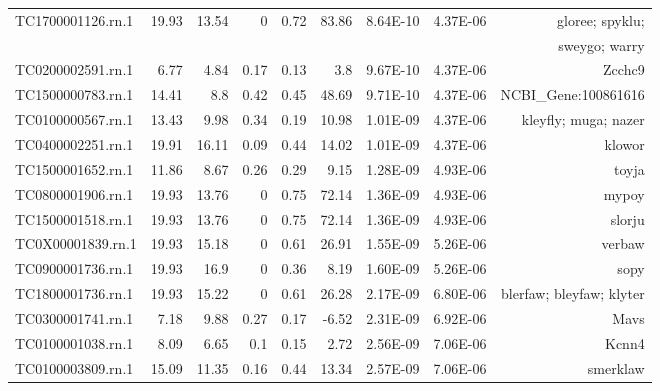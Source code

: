 \begin{sidewaystable}[]
\begin{tabular}{lrrrrrrrr}
TC1700001126.rn.1 & 19.93          & 13.54          & 0      & 0.72   & 83.86       & 8.64E-10 & 4.37E-06  & gloree; spyklu; \\
&           &           &      &    &        &  &   & sweygo; warry \\
TC0200002591.rn.1 & 6.77           & 4.84           & 0.17   & 0.13   & 3.8         & 9.67E-10 & 4.37E-06  & Zcchc9                        \\
TC1500000783.rn.1 & 14.41          & 8.8            & 0.42   & 0.45   & 48.69       & 9.71E-10 & 4.37E-06  & NCBI\_Gene:100861616          \\
TC0100000567.rn.1 & 13.43          & 9.98           & 0.34   & 0.19   & 10.98       & 1.01E-09 & 4.37E-06  & kleyfly; muga; nazer          \\
TC0400002251.rn.1 & 19.91          & 16.11          & 0.09   & 0.44   & 14.02       & 1.01E-09 & 4.37E-06  & klowor                        \\
TC1500001652.rn.1 & 11.86          & 8.67           & 0.26   & 0.29   & 9.15        & 1.28E-09 & 4.93E-06  & toyja                         \\
TC0800001906.rn.1 & 19.93          & 13.76          & 0      & 0.75   & 72.14       & 1.36E-09 & 4.93E-06  & mypoy                         \\
TC1500001518.rn.1 & 19.93          & 13.76          & 0      & 0.75   & 72.14       & 1.36E-09 & 4.93E-06  & slorju                        \\
TC0X00001839.rn.1 & 19.93          & 15.18          & 0      & 0.61   & 26.91       & 1.55E-09 & 5.26E-06  & verbaw                        \\
TC0900001736.rn.1 & 19.93          & 16.9           & 0      & 0.36   & 8.19        & 1.60E-09 & 5.26E-06  & sopy                          \\
TC1800001736.rn.1 & 19.93          & 15.22          & 0      & 0.61   & 26.28       & 2.17E-09 & 6.80E-06  & blerfaw; bleyfaw; klyter      \\
TC0300001741.rn.1 & 7.18           & 9.88           & 0.27   & 0.17   & -6.52       & 2.31E-09 & 6.92E-06  & Mavs                          \\
TC0100001038.rn.1 & 8.09           & 6.65           & 0.1    & 0.15   & 2.72        & 2.56E-09 & 7.06E-06  & Kcnn4                         \\
TC0100003809.rn.1 & 15.09          & 11.35          & 0.16   & 0.44   & 13.34       & 2.57E-09 & 7.06E-06  & smerklaw                      \\

\end{tabular}
\end{sidewaystable}
